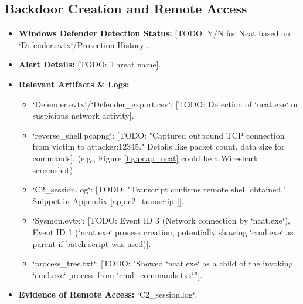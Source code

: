\documentclass[11pt]{article}
\begin{document}
	\subsection{Backdoor Creation and Remote Access}
	\begin{itemize}
		\item \textbf{Windows Defender Detection Status:} [TODO: Y/N for Ncat based on `Defender.evtx`/Protection History].
		\item \textbf{Alert Details:} [TODO: Threat name].
		\item \textbf{Relevant Artifacts & Logs:}
		\begin{itemize}
			\item `Defender.evtx`/`Defender_export.csv`: [TODO: Detection of `ncat.exe` or suspicious network activity].
			\item `reverse_shell.pcapng`: [TODO: "Captured outbound TCP connection from victim to attacker:12345." Details like packet count, data size for commands]. (e.g., Figure \ref{fig:pcap_ncat} could be a Wireshark screenshot).
			\item `C2_session.log`: [TODO: "Transcript confirms remote shell obtained." Snippet in Appendix \ref{app:c2_transcript}].
			\item `Sysmon.evtx`: [TODO: Event ID 3 (Network connection by `ncat.exe`), Event ID 1 (`ncat.exe` process creation, potentially showing `cmd.exe` as parent if batch script was used)].
			\item `process_tree.txt`: [TODO: "Showed `ncat.exe` as a child of the invoking `cmd.exe` process from `cmd_commands.txt`."].
		\end{itemize}
		\item \textbf{Evidence of Remote Access:} `C2_session.log`.
	\end{itemize}
	
\end{document}
